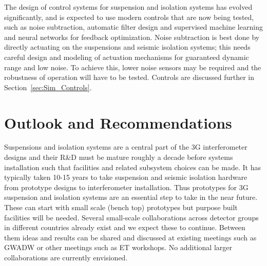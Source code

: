  The design of control systems for suspension and isolation systems has evolved significantly, and is expected to use modern controls that are now being tested, such as noise subtraction, automatic filter design and supervised machine learning and neural networks for feedback optimization. 
Noise subtraction is best done by directly actuating on the suspensions and seismic isolation systems; this needs careful design and modeling of actuation mechanisms for guaranteed dynamic range and low noise.  To achieve this, lower noise sensors may be required and the robustness of operation will have to be tested. Controls are discussed further in Section~\ref{sec:Sim_Controls}.

\section{Outlook and Recommendations}


Suspensions and isolation systems are a central part of the 3G interferometer designs and their R\&D must be mature roughly a decade before systems installation such that facilities and related subsystem choices can be made. It has typically taken 10-15 years to take suspension and seismic isolation hardware from prototype designs to interferometer installation. Thus prototypes for 3G suspension and isolation systems are an essential step to take in the near future. These can start with small scale (bench top) prototypes but purpose built facilities will be needed.  Several small-scale collaborations across detector groups in different countries already exist and we expect these to continue. Between them ideas and results can be shared and discussed at existing meetings such as GWADW or other meetings such as ET workshops. No additional larger collaborations are currently envisioned. 

